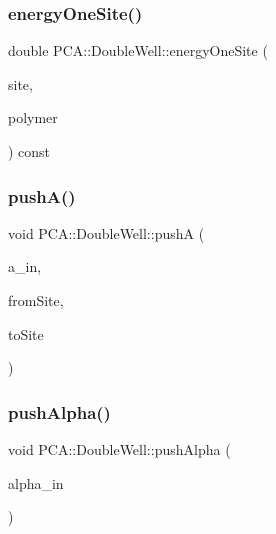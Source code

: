 \hypertarget{class_p_c_a_1_1_double_well_a919d4cfd87c1eebeae8a4d305380681f}{}\label{class_p_c_a_1_1_double_well_a919d4cfd87c1eebeae8a4d305380681f} 
\subsubsection{\texorpdfstring{energy\+One\+Site()}{energyOneSite()}}
{\footnotesize\ttfamily double P\+C\+A\+::\+Double\+Well\+::energy\+One\+Site (\begin{DoxyParamCaption}\item[{int}]{site,  }\item[{const \hyperlink{class_p_c_a_1_1_polymer_m_c}{Polymer\+MC} \&}]{polymer }\end{DoxyParamCaption}) const}

\hypertarget{class_p_c_a_1_1_double_well_a932ba9e3da3e1542ede92e8853831518}{}\label{class_p_c_a_1_1_double_well_a932ba9e3da3e1542ede92e8853831518} 
\subsubsection{\texorpdfstring{push\+A()}{pushA()}}
{\footnotesize\ttfamily void P\+C\+A\+::\+Double\+Well\+::pushA (\begin{DoxyParamCaption}\item[{double}]{a\+\_\+in,  }\item[{int}]{from\+Site,  }\item[{int}]{to\+Site }\end{DoxyParamCaption})}

\hypertarget{class_p_c_a_1_1_double_well_a8aa1ca5ae0d8ab540aff9693a1c44a0b}{}\label{class_p_c_a_1_1_double_well_a8aa1ca5ae0d8ab540aff9693a1c44a0b} 
\subsubsection{\texorpdfstring{push\+Alpha()}{pushAlpha()}}
{\footnotesize\ttfamily void P\+C\+A\+::\+Double\+Well\+::push\+Alpha (\begin{DoxyParamCaption}\item[{double}]{alpha\+\_\+in }\end{DoxyParamCaption})}

